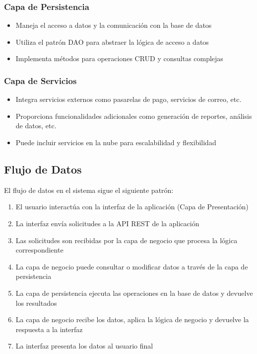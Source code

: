\documentclass[12pt,a4paper]{article}
\begin{document}
\subsubsection{Capa de Persistencia}

\begin{itemize}
    \item Maneja el acceso a datos y la comunicación con la base de datos
    \item Utiliza el patrón DAO para abstraer la lógica de acceso a datos
    \item Implementa métodos para operaciones CRUD y consultas complejas
\end{itemize}

\subsubsection{Capa de Servicios}

\begin{itemize}
    \item Integra servicios externos como pasarelas de pago, servicios de correo, etc.
    \item Proporciona funcionalidades adicionales como generación de reportes, análisis de datos, etc.
    \item Puede incluir servicios en la nube para escalabilidad y flexibilidad
\end{itemize}

\subsection{Flujo de Datos}

El flujo de datos en el sistema sigue el siguiente patrón:

\begin{enumerate}
    \item El usuario interactúa con la interfaz de la aplicación (Capa de Presentación)
    \item La interfaz envía solicitudes a la API REST de la aplicación
    \item Las solicitudes son recibidas por la capa de negocio que procesa la lógica correspondiente
    \item La capa de negocio puede consultar o modificar datos a través de la capa de persistencia
    \item La capa de persistencia ejecuta las operaciones en la base de datos y devuelve los resultados
    \item La capa de negocio recibe los datos, aplica la lógica de negocio y devuelve la respuesta a la interfaz
    \item La interfaz presenta los datos al usuario final
\end{enumerate}
\end{document}
